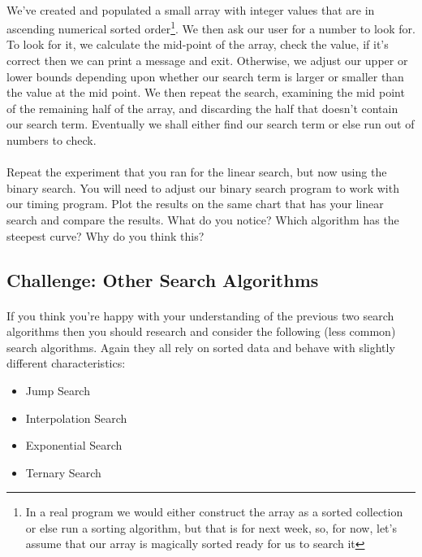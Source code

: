 \documentclass[10pt, a4paper, twosize]{article}
\begin{document}
\paragraph{} We've created and populated a small array with integer values that are in ascending numerical sorted order\footnote{In a real program we would either construct the array as a sorted collection or else run a sorting algorithm, but that is for next week, so, for now, let's assume that our array is magically sorted ready for us to search it}. We then ask our user for a number to look for. To look for it, we calculate the mid-point of the array, check the value, if it's correct then we can print a message and exit. Otherwise, we adjust our upper or lower bounds depending upon whether our search term is larger or smaller than the value at the mid point. We then repeat the search, examining the mid point of the remaining half of the array, and discarding the half that doesn't contain our search term. Eventually we shall either find our search term or else run out of numbers to check.

\paragraph{} Repeat the experiment that you ran for the linear search, but now using the binary search. You will need to adjust our binary search program to work with our timing program. Plot the results on the same chart that has your linear search and compare the results. What do you notice? Which algorithm has the steepest curve? Why do you think this?

\subsection{Challenge: Other Search Algorithms}

\paragraph{} If you think you're happy with your understanding of the previous two search algorithms then you should research and consider the following (less common) search algorithms. Again they all rely on sorted data and behave with slightly different characteristics:

\begin{itemize}
\item Jump Search
\item Interpolation Search
\item Exponential Search
\item Ternary Search
\end{itemize}
\end{document}
